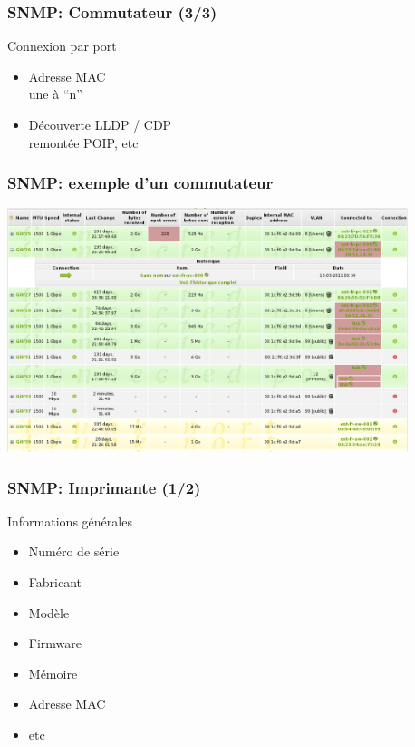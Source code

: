\documentclass{beamer}
\begin{document}
\begin{frame}
    \frametitle{SNMP: Commutateur (3/3)}

    \begin{block}{Connexion par port}
    \begin{itemize}
    \item Adresse MAC \\ 
    \small{une à “n”}
    \item Découverte LLDP / CDP \\
    \small{remontée POIP, etc}
    \end{itemize}
    \end{block}
\end{frame}

\begin{frame}
    \frametitle{SNMP: exemple d'un commutateur}

    \begin{center}
    \includegraphics[width=11.7cm]{./pics/switch_ports.png}
    \end{center}
\end{frame}

\begin{frame}
    \frametitle{SNMP: Imprimante (1/2)}

    \begin{block}{Informations générales}
    \begin{itemize}
    \item Numéro de série
    \item Fabricant
    \item Modèle
    \item Firmware
    \item Mémoire
    \item Adresse MAC
    \item etc
    \end{itemize}
    \end{block}
\end{frame}
\end{document}
